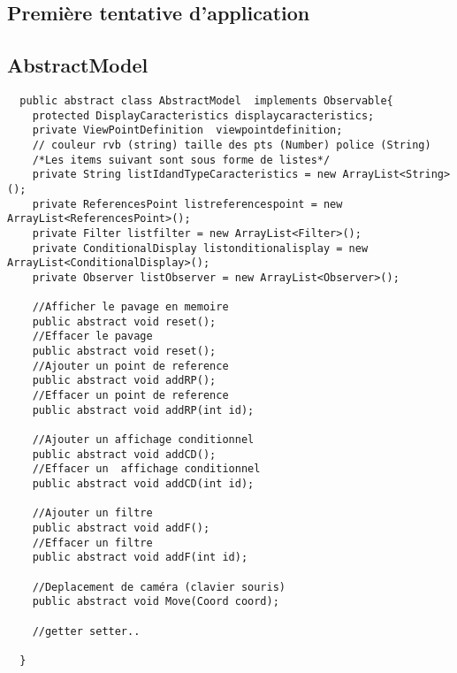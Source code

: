 \documentclass{article}
\begin{document}
\subsection{Première tentative d'application}
\subsection{AbstractModel}
\begin{verbatim}
  public abstract class AbstractModel  implements Observable{
    protected DisplayCaracteristics displaycaracteristics; 
    private ViewPointDefinition  viewpointdefinition;
    // couleur rvb (string) taille des pts (Number) police (String)
    /*Les items suivant sont sous forme de listes*/
    private String listIdandTypeCaracteristics = new ArrayList<String>();	
    private ReferencesPoint listreferencespoint = new ArrayList<ReferencesPoint>();	
    private Filter listfilter = new ArrayList<Filter>();	
    private ConditionalDisplay listonditionalisplay = new ArrayList<ConditionalDisplay>();	
    private Observer listObserver = new ArrayList<Observer>();	
    
    //Afficher le pavage en memoire
    public abstract void reset();
    //Effacer le pavage
    public abstract void reset();
    //Ajouter un point de reference
    public abstract void addRP();
    //Effacer un point de reference
    public abstract void addRP(int id);

    //Ajouter un affichage conditionnel 
    public abstract void addCD();
    //Effacer un  affichage conditionnel 
    public abstract void addCD(int id);

    //Ajouter un filtre
    public abstract void addF();
    //Effacer un filtre
    public abstract void addF(int id);
    
    //Deplacement de caméra (clavier souris)
    public abstract void Move(Coord coord);

    //getter setter..
    
  }
\end{verbatim} 
\end{document}

